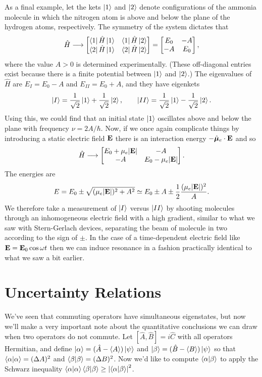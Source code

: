 \documentclass[../p116main.tex]{subfiles}
\begin{document}
As a final example, let the kets $\left| 1 \right>$ and $\left| 2 \right>$ denote configurations of the ammonia molecule in which the nitrogen atom is above and below the plane of the hydrogen atoms, respectively.
The symmetry of the system dictates that
\[ \hat H \longrightarrow \begin{bmatrix} \left< 1 \right| \hat H \left| 1 \right> & \left< 1 \right| \hat H \left| 2 \right> \\ \left< 2 \right| \hat H \left| 1 \right> & \left< 2 \right| \hat H \left| 2 \right> \end{bmatrix} = \begin{bmatrix} E_0 & -A \\ -A & E_0 \end{bmatrix}, \]
where the value $A > 0$ is determined experimentally.
(These off-diagonal entries exist because there is a finite potential between $\left| 1 \right>$ and $\left| 2 \right>$.)
The eigenvalues of $\hat H$ are $E_I = E_0 - A$ and $E_{II} = E_0 + A$, and they have eigenkets
\[ \left| I \right> = \frac{1}{\sqrt{2}} \left| 1 \right> + \frac{1}{\sqrt{2}} \left| 2 \right>, \qquad \left| II \right> = \frac{1}{\sqrt{2}} \left| 1 \right> - \frac{1}{\sqrt{2}} \left| 2 \right>. \]
Using this, we could find that an initial state $\left| 1 \right>$ oscillates above and below the plane with frequency $\nu = 2A / \hbar$.
Now, if we once again complicate things by introducing a static electric field $\mathbf{E}$ there is an interaction energy $-\hat{\bm \mu}_e \cdot \mathbf{E}$ and so
\[ \hat H \longrightarrow \begin{bmatrix} E_0 + \mu_e |\mathbf{E}| & -A \\ -A &  E_0- \mu_e |\mathbf{E}| \end{bmatrix}. \]
The energies are
\[ E = E_0 \pm \sqrt{(\mu_e |\mathbf{E}|)^2 + A^2} \simeq E_0 \pm A \pm \frac{1}{2} \frac{(\mu_e |\mathbf{E}|)^2}{A}. \]
We therefore take a measurement of $\left| I \right>$ versus $\left| II \right>$ by shooting molecules through an inhomogeneous electric field with a high gradient, similar to what we saw with Stern-Gerlach devices, separating the beam of molecule in two according to the sign of $\pm$.
In the case of a time-dependent electric field like $\mathbf{E} = \mathbf{E}_0 \cos \omega t$ then we can induce resonance in a fashion practically identical to what we saw a bit earlier.

\section{Uncertainty Relations}
We've seen that commuting operators have simultaneous eigenstates, but now we'll make a very important note about the quantitative conclusions we can draw when two operators do not commute.
Let $[\hat A, \hat B] = i \hat C$ with all operators Hermitian, and define $\left| \alpha \right> = (\hat A - \langle A \rangle) \left| \psi \right>$ and $\left| \beta \right> = (\hat B - \langle B \rangle) \left| \psi \right>$ so that $\left< \alpha \middle| \alpha \right> = (\Delta A)^2$ and $\left< \beta \middle| \beta \right> = (\Delta B)^2$.
Now we'd like to compute $\left< \alpha \middle| \beta \right>$ to apply the Schwarz inequality $\left< \alpha \middle| \alpha \right> \left< \beta \middle| \beta \right> \geq \left| \left< \alpha \middle| \beta \right> \right|^2$.
\end{document}
